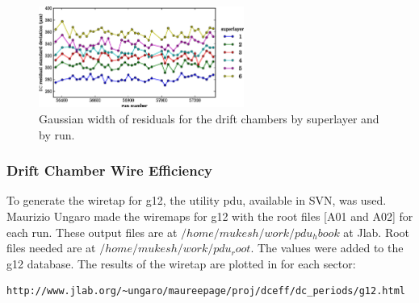 \begin{figure}\begin{center}
\includegraphics[width=0.6\textwidth]{figures/calib/dc/dc_resid_sigma.eps}
\caption[DC Residuals (Width)]{\label{fig:calib.dc.residuals.wid}Gaussian width of residuals for the drift chambers by superlayer and by run.}
\end{center}\end{figure}

\FloatBarrier

\subsubsection{\label{sec:calib.dc.eff}Drift Chamber Wire Efficiency}
To generate the wiretap for g12, the utility pdu, available in SVN, was used. Maurizio Ungaro made the wiremaps for g12 with the root files [A01 and A02] for each run. These output files are at $/home/mukesh/work/pdu_hbook$ at Jlab. Root files needed are at $/home/mukesh/work/pdu_root$. The values were added to the g12 database. The results of the wiretap are plotted in for each sector:

\begin{verbatim}
http://www.jlab.org/~ungaro/maureepage/proj/dceff/dc_periods/g12.html
\end{verbatim}

\FloatBarrier
